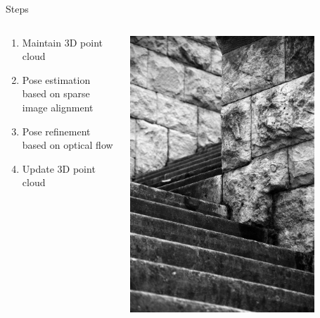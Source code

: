 \documentclass[aspectratio=169]{beamer}
\begin{document}
\begin{frame}{Steps}
  \begin{columns}[c]
    \begin{column}{0.5\linewidth}
      \begin{enumerate}
        \item Maintain 3D point cloud
        \item Pose estimation based on sparse image alignment
        \item Pose refinement based on optical flow
        \item Update 3D point cloud
      \end{enumerate}
    \end{column}
    \begin{column}{0.3\linewidth}
      \begin{center}
        \includegraphics[width=0.8\textwidth]{./img/steps.jpg}
      \end{center}
    \end{column}
  \end{columns}
\end{frame}
\end{document}
